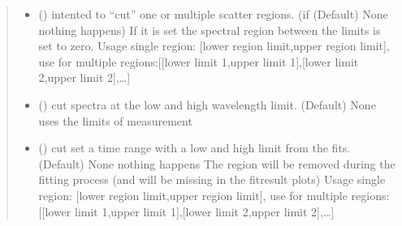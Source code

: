 \documentclass[letterpaper,10pt,english]{sphinxmanual}
\begin{document}
\begin{fulllineitems}
\begin{quote}
\begin{description}
\begin{itemize}
\item {} 
 (\sphinxstyleliteralemphasis{\sphinxupquote{ (}}\sphinxstyleliteralemphasis{\sphinxupquote{, }}\sphinxstyleliteralemphasis{\sphinxupquote{)}}\sphinxstyleliteralemphasis{\sphinxupquote{, }}) \textendash{} intented to “cut” one or multiple scatter regions. (if (Default) None nothing
happens) If it is set the spectral region between the limits is set to zero.
Usage single region: {[}lower region limit,upper region limit{]},
use for multiple regions:{[}{[}lower limit 1,upper limit 1{]},{[}lower limit 2,upper limit 2{]},…{]}

\item {} 
 (\sphinxstyleliteralemphasis{\sphinxupquote{ (}}\sphinxstyleliteralemphasis{\sphinxupquote{)}}\sphinxstyleliteralemphasis{\sphinxupquote{, }}) \textendash{} cut spectra at the low and high wavelength limit. (Default) None
uses the limits of measurement

\item {} 
 (\sphinxstyleliteralemphasis{\sphinxupquote{ (}}\sphinxstyleliteralemphasis{\sphinxupquote{)}}\sphinxstyleliteralemphasis{\sphinxupquote{, }}) \textendash{} cut set a time range with a low and high limit from the fits. (Default) None nothing happens
The region will be removed during the fitting process (and will be missing in the fit\sphinxhyphen{}result
plots)
Usage single region: {[}lower region limit,upper region limit{]},
use for multiple regions:{[}{[}lower limit 1,upper limit 1{]},{[}lower limit 2,upper limit 2{]},…{]}


\end{itemize}
\end{description}
\end{quote}
\end{fulllineitems}
\end{document}

